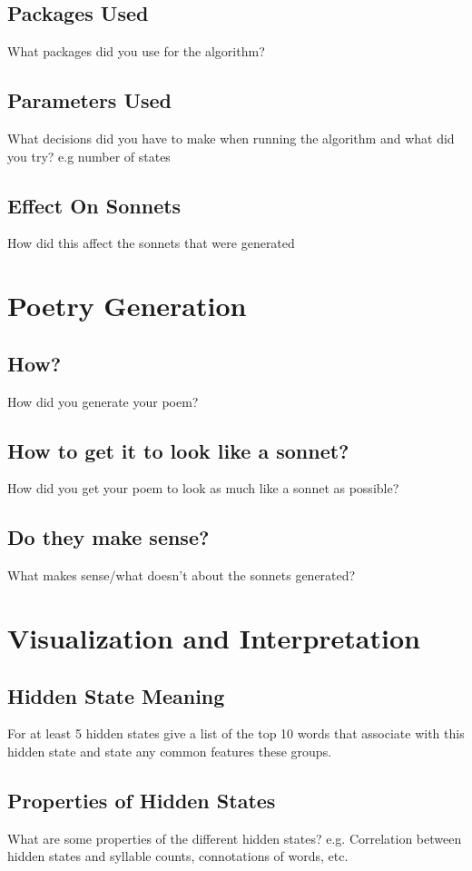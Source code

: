 \subsection{Packages Used}
What packages did you use for the algorithm?
\subsection{Parameters Used}
What decisions did you have to make when running the algorithm and what did you try? e.g number of states
\subsection{Effect On Sonnets}
How did this affect the sonnets that were generated



\section{Poetry Generation}
\subsection{How?}
How did you generate your poem?
\subsection{How to get it to look like a sonnet?}
How did you get your poem to look as much like a sonnet as possible?
\subsection{Do they make sense?}
What makes sense/what doesn't about the sonnets generated?



\section{Visualization and Interpretation}
\subsection{Hidden State Meaning}
For at least 5 hidden states give a list of the top 10 words that associate with this hidden state and state any common features these groups.
\subsection{Properties of Hidden States}
What are some properties of the different hidden states?
e.g. Correlation between hidden states and syllable counts, connotations of words, etc.
